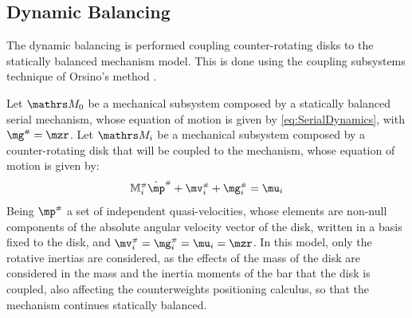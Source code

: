 \documentclass[a4paper,11pt,brazil,fleqn]{article}
\begin{document}
\subsection{Dynamic Balancing}\label{S02-3}

The dynamic balancing is performed coupling counter-rotating disks to the statically balanced mechanism model. This is done using the coupling subsystems technique of Orsino's method \cite{19orsino}.

Let $\ssM_0$ be a mechanical subsystem composed by a statically balanced serial mechanism, whose equation of motion is given by \eqref{eq:SerialDynamics}, with $\mg\ssh = \mzr$. Let $\ssM_i$ be a mechanical subsystem composed by a counter-rotating disk that will be coupled to the mechanism, whose equation of motion is given by:
\begin{equation}\label{eq:DiscDynamics}
\mM\ssh_i \dot{\mp}\ssh + \mv\ssh_i + \mg\ssh_i = \mu_i
\end{equation}
Being $\mp\ssh$ a set of independent quasi-velocities, whose elements are non-null components of the absolute angular velocity vector of the disk, written in a basis fixed to the disk, and $\mv\ssh_i = \mg\ssh_i = \mu_i = \mzr$. In this model, only the rotative inertias are considered, as the effects of the mass of the disk are considered in the mass and the inertia moments of the bar that the disk is coupled, also affecting the counterweights positioning calculus, so that the mechanism continues statically balanced.
\end{document}
